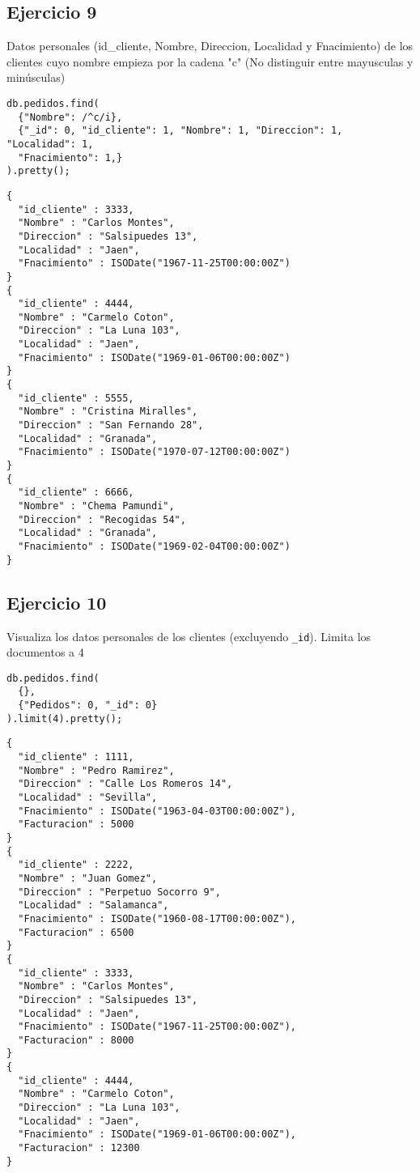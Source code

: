 \subsection{Ejercicio 9}

Datos personales (id\_cliente, Nombre, Direccion, Localidad y Fnacimiento) de los clientes cuyo nombre empieza por la cadena "c" (No distinguir entre mayusculas y minúsculas)

\begin{lstlisting}
db.pedidos.find(
  {"Nombre": /^c/i}, 
  {"_id": 0, "id_cliente": 1, "Nombre": 1, "Direccion": 1, "Localidad": 1, 
  "Fnacimiento": 1,}
).pretty();
\end{lstlisting}

\begin{lstlisting}
{
  "id_cliente" : 3333,
  "Nombre" : "Carlos Montes",
  "Direccion" : "Salsipuedes 13",
  "Localidad" : "Jaen",
  "Fnacimiento" : ISODate("1967-11-25T00:00:00Z")
}
{
  "id_cliente" : 4444,
  "Nombre" : "Carmelo Coton",
  "Direccion" : "La Luna 103",
  "Localidad" : "Jaen",
  "Fnacimiento" : ISODate("1969-01-06T00:00:00Z")
}
{
  "id_cliente" : 5555,
  "Nombre" : "Cristina Miralles",
  "Direccion" : "San Fernando 28",
  "Localidad" : "Granada",
  "Fnacimiento" : ISODate("1970-07-12T00:00:00Z")
}
{
  "id_cliente" : 6666,
  "Nombre" : "Chema Pamundi",
  "Direccion" : "Recogidas 54",
  "Localidad" : "Granada",
  "Fnacimiento" : ISODate("1969-02-04T00:00:00Z")
}
\end{lstlisting}

\subsection{Ejercicio 10}

Visualiza los datos personales de los clientes (excluyendo \texttt{\_id}). Limita los documentos a 4

\begin{lstlisting}
db.pedidos.find(
  {}, 
  {"Pedidos": 0, "_id": 0}
).limit(4).pretty();
\end{lstlisting}

\begin{lstlisting}
{
  "id_cliente" : 1111,
  "Nombre" : "Pedro Ramirez",
  "Direccion" : "Calle Los Romeros 14",
  "Localidad" : "Sevilla",
  "Fnacimiento" : ISODate("1963-04-03T00:00:00Z"),
  "Facturacion" : 5000
}
{
  "id_cliente" : 2222,
  "Nombre" : "Juan Gomez",
  "Direccion" : "Perpetuo Socorro 9",
  "Localidad" : "Salamanca",
  "Fnacimiento" : ISODate("1960-08-17T00:00:00Z"),
  "Facturacion" : 6500
}
{
  "id_cliente" : 3333,
  "Nombre" : "Carlos Montes",
  "Direccion" : "Salsipuedes 13",
  "Localidad" : "Jaen",
  "Fnacimiento" : ISODate("1967-11-25T00:00:00Z"),
  "Facturacion" : 8000
}
{
  "id_cliente" : 4444,
  "Nombre" : "Carmelo Coton",
  "Direccion" : "La Luna 103",
  "Localidad" : "Jaen",
  "Fnacimiento" : ISODate("1969-01-06T00:00:00Z"),
  "Facturacion" : 12300
}
\end{lstlisting}

